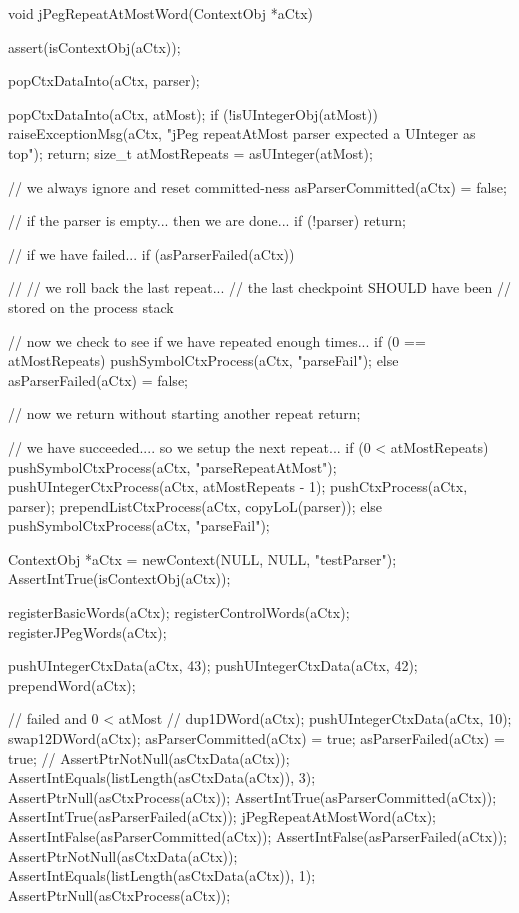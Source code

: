 \startCCode
void jPegRepeatAtMostWord(ContextObj *aCtx) {
  assert(isContextObj(aCtx));

  popCtxDataInto(aCtx, parser);

  popCtxDataInto(aCtx, atMost);
  if (!isUIntegerObj(atMost)) {
    raiseExceptionMsg(aCtx,
      "jPeg repeatAtMost parser expected a UInteger as top");
    return;
  }
  size_t atMostRepeats = asUInteger(atMost);

  // we always ignore and reset committed-ness
  asParserCommitted(aCtx) = false;

  // if the parser is empty... then we are done...
  if (!parser) return;

  // if we have failed...
  if (asParserFailed(aCtx)) {
    //
    // we roll back the last repeat...
    // the last checkpoint SHOULD have been
    // stored on the process stack
    
    // now we check to see if we have repeated enough times...
     if (0 == atMostRepeats) {
       pushSymbolCtxProcess(aCtx, "parseFail");
     } else {
      asParserFailed(aCtx) = false;
     }
    
    // now we return without starting another repeat
    return;
  }
  
  // we have succeeded.... so we setup the next repeat...
  if (0 < atMostRepeats) {
    pushSymbolCtxProcess(aCtx, "parseRepeatAtMost");
    pushUIntegerCtxProcess(aCtx, atMostRepeats - 1);
    pushCtxProcess(aCtx, parser);
    prependListCtxProcess(aCtx, copyLoL(parser));
  } else {
    pushSymbolCtxProcess(aCtx, "parseFail");
  }
}
\stopCCode
{}

\startCTest
  ContextObj *aCtx = newContext(NULL, NULL, "testParser");
  AssertIntTrue(isContextObj(aCtx));
  
  registerBasicWords(aCtx);
  registerControlWords(aCtx);
  registerJPegWords(aCtx);
  
  pushUIntegerCtxData(aCtx, 43);
  pushUIntegerCtxData(aCtx, 42);
  prependWord(aCtx);

  // failed and 0 < atMost
  //
  dup1DWord(aCtx);
  pushUIntegerCtxData(aCtx, 10);
  swap12DWord(aCtx);
  asParserCommitted(aCtx) = true;
  asParserFailed(aCtx) = true;
  //
  AssertPtrNotNull(asCtxData(aCtx));
  AssertIntEquals(listLength(asCtxData(aCtx)), 3);
  AssertPtrNull(asCtxProcess(aCtx));
  AssertIntTrue(asParserCommitted(aCtx));
  AssertIntTrue(asParserFailed(aCtx));
  jPegRepeatAtMostWord(aCtx);
  AssertIntFalse(asParserCommitted(aCtx));
  AssertIntFalse(asParserFailed(aCtx));
  AssertPtrNotNull(asCtxData(aCtx));
  AssertIntEquals(listLength(asCtxData(aCtx)), 1);
  AssertPtrNull(asCtxProcess(aCtx));

